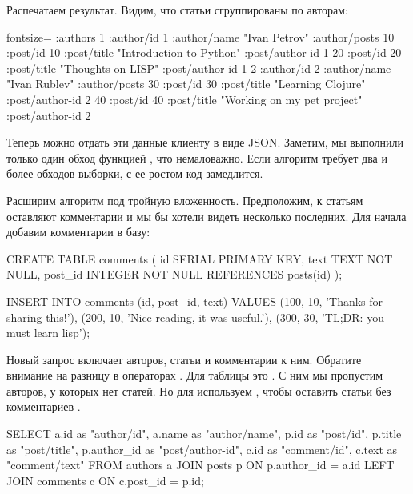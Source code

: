 Распечатаем результат. Видим, что статьи сгруппированы по авторам:

\begin{english}
  \begin{clojure*}{fontsize=\small}
{:authors
 {1 {:author/id 1
     :author/name "Ivan Petrov"
     :author/posts
       {10 {:post/id 10
            :post/title "Introduction to Python"
            :post/author-id 1}
        20 {:post/id 20
            :post/title "Thoughts on LISP"
            :post/author-id 1}}}
  2 {:author/id 2
     :author/name "Ivan Rublev"
     :author/posts
       {30 {:post/id 30
            :post/title "Learning Clojure"
            :post/author-id 2}
        40 {:post/id 40
            :post/title "Working on my pet project"
            :post/author-id 2}}}}}
  \end{clojure*}
\end{english}

Теперь можно отдать эти данные клиенту в виде JSON. Заметим, мы выполнили только один обход функцией , что немаловажно. Если алгоритм требует два и более обходов выборки, с ее ростом код замедлится.

Расширим алгоритм под тройную вложенность. Предположим, к статьям оставляют комментарии и мы бы хотели видеть несколько последних. Для начала добавим комментарии в базу:

\begin{english}
  \begin{sql}
CREATE TABLE comments (
  id SERIAL PRIMARY KEY,
  text TEXT NOT NULL,
  post_id INTEGER NOT NULL REFERENCES posts(id)
);

INSERT INTO comments (id, post_id, text) VALUES
  (100, 10, 'Thanks for sharing this!'),
  (200, 10, 'Nice reading, it was useful.'),
  (300, 30, 'TL;DR: you must learn lisp');
  \end{sql}
\end{english}

Новый запрос включает авторов, статьи и комментарии к ним. Обратите внимание на разницу в операторах . Для таблицы  это  . С ним мы пропустим авторов, у которых нет статей. Но для  используем , чтобы оставить статьи без комментариев .

\begin{english}
  \begin{sql/lines}
SELECT
  a.id        as "author/id",
  a.name      as "author/name",
  p.id        as "post/id",
  p.title     as "post/title",
  p.author_id as "post/author-id",
  c.id        as "comment/id",
  c.text      as "comment/text"
FROM authors a
JOIN posts p ON p.author_id = a.id
LEFT JOIN comments c ON c.post_id = p.id;
  \end{sql/lines}
\end{english}

